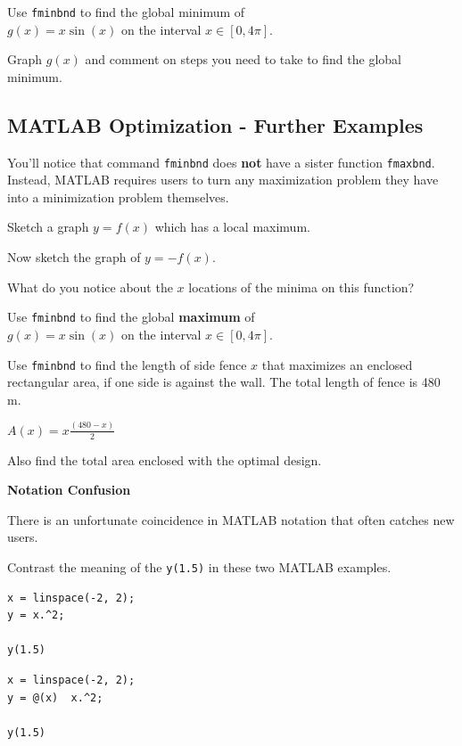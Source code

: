 \newpage
\problem Use \texttt{fminbnd} to find the global minimum of \\
$g(x) = x \sin(x)$ on the interval $x \in [0, 4\pi]$.

\vfill

Graph $g(x)$ and comment on steps you need to take to find the global
minimum.
\vfill

\newpage

\subsection*{MATLAB Optimization - Further Examples}

You'll notice that command \texttt{fminbnd} does {\bf not} have a
sister function \texttt{fmaxbnd}.  Instead, MATLAB requires users to
turn any maximization problem they have into a minimization problem
themselves. \\[1ex]
 
\begin{minipage}[t]{0.6\linewidth}
  
\problem Sketch a graph $y = f(x)$ which has a local maximum.
\vspace{2in}

Now sketch the graph of $y = -f(x)$.  

What do you notice about the $x$ locations of the minima on this
function?  
\vspace{1in}~
\end{minipage}


\newpage
\problem Use \texttt{fminbnd} to find the global {\bf maximum} of \\
$g(x) = x \sin(x)$ on the interval $x \in [0, 4\pi]$.

\newpage
\problem Use \texttt{fminbnd} to find the length of side fence $x$
that maximizes an enclosed rectangular area, if one side is against
the wall.  The total length of fence is 480 m.

$\displaystyle A(x) = x \frac{(480-x)}{2}$

\vfill

Also find the total area enclosed with the optimal design.  \vspace{1in}


\newpage

{\bf Notation Confusion}

There is an unfortunate coincidence in MATLAB notation that often
catches new users.

\problem Contrast the meaning of the \texttt{y(1.5)} in these two
MATLAB examples.


\begin{minipage}[t]{0.45\linewidth}
\vspace{0pt}
\begin{verbatim}
x = linspace(-2, 2);
y = x.^2;

y(1.5)
\end{verbatim}
\end{minipage} \hfill
\begin{minipage}[t]{0.45\linewidth}
\vspace{0pt}
\begin{verbatim}
x = linspace(-2, 2);
y = @(x)  x.^2;

y(1.5)
\end{verbatim}
  
\end{minipage} 







